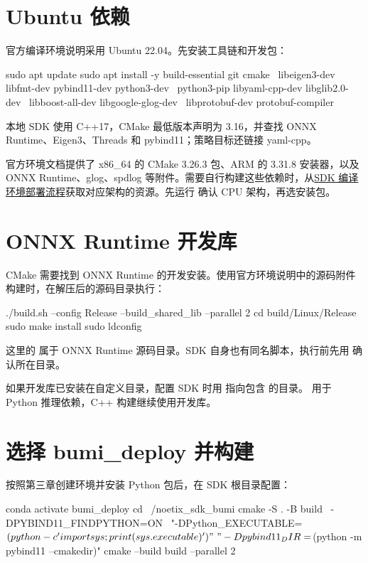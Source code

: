 \section{Ubuntu 依赖}
官方编译环境说明采用 Ubuntu 22.04。先安装工具链和开发包：
\par\noindent\begin{minipage}{\linewidth}
\begin{command}
sudo apt update
sudo apt install -y build-essential git cmake \
  libeigen3-dev libfmt-dev pybind11-dev python3-dev \
  python3-pip libyaml-cpp-dev libglib2.0-dev \
  libboost-all-dev libgoogle-glog-dev \
  libprotobuf-dev protobuf-compiler
\end{command}
\end{minipage}\par

本地 SDK 使用 C++17，CMake 最低版本声明为 3.16，并查找 ONNX Runtime、Eigen3、Threads 和 pybind11；策略目标还链接 yaml-cpp。

官方环境文档提供了 x86\_64 的 CMake 3.26.3 包、ARM 的 3.31.8 安装器，以及 ONNX Runtime、glog、spdlog 等附件。需要自行构建这些依赖时，从\href{https://noetixrobotics.feishu.cn/docx/PP2BdXkSUoQ2VOxctJKcEdHanAg}{SDK 编译环境部署流程}获取对应架构的资源。先运行  确认 CPU 架构，再选安装包。
\section{ONNX Runtime 开发库}
CMake 需要找到 ONNX Runtime 的开发安装。使用官方环境说明中的源码附件构建时，在解压后的源码目录执行：
\par\noindent\begin{minipage}{\linewidth}
\begin{command}
./build.sh --config Release --build_shared_lib --parallel 2
cd build/Linux/Release
sudo make install
sudo ldconfig
\end{command}
\end{minipage}\par

这里的  属于 ONNX Runtime 源码目录。SDK 自身也有同名脚本，执行前先用  确认所在目录。

如果开发库已安装在自定义目录，配置 SDK 时用  指向包含  的目录。 用于 Python 推理依赖，C++ 构建继续使用开发库。
\section{选择 bumi\_deploy 并构建}
按照第三章创建环境并安装 Python 包后，在 SDK 根目录配置：
\par\noindent\begin{minipage}{\linewidth}
\begin{command}
conda activate bumi_deploy
cd ~/noetix_sdk_bumi
cmake -S . -B build \
  -DPYBIND11_FINDPYTHON=ON \
  "-DPython_EXECUTABLE=$(python -c 'import sys; print(sys.executable)')" \
  "-Dpybind11_DIR=$(python -m pybind11 --cmakedir)"
cmake --build build --parallel 2
\end{command}
\end{minipage}\par

